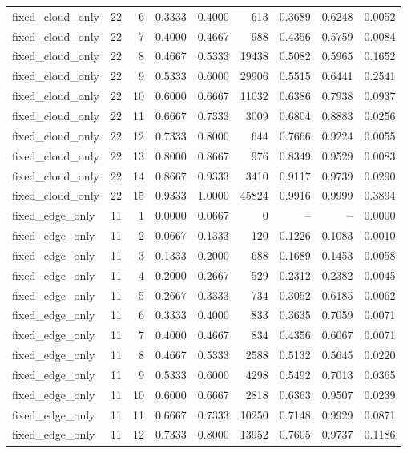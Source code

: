 \begin{tabular}{lrrrrrrrr}
fixed\_cloud\_only & 22 & 6 & 0.3333 & 0.4000 & 613 & 0.3689 & 0.6248 & 0.0052 \\
fixed\_cloud\_only & 22 & 7 & 0.4000 & 0.4667 & 988 & 0.4356 & 0.5759 & 0.0084 \\
fixed\_cloud\_only & 22 & 8 & 0.4667 & 0.5333 & 19438 & 0.5082 & 0.5965 & 0.1652 \\
fixed\_cloud\_only & 22 & 9 & 0.5333 & 0.6000 & 29906 & 0.5515 & 0.6441 & 0.2541 \\
fixed\_cloud\_only & 22 & 10 & 0.6000 & 0.6667 & 11032 & 0.6386 & 0.7938 & 0.0937 \\
fixed\_cloud\_only & 22 & 11 & 0.6667 & 0.7333 & 3009 & 0.6804 & 0.8883 & 0.0256 \\
fixed\_cloud\_only & 22 & 12 & 0.7333 & 0.8000 & 644 & 0.7666 & 0.9224 & 0.0055 \\
fixed\_cloud\_only & 22 & 13 & 0.8000 & 0.8667 & 976 & 0.8349 & 0.9529 & 0.0083 \\
fixed\_cloud\_only & 22 & 14 & 0.8667 & 0.9333 & 3410 & 0.9117 & 0.9739 & 0.0290 \\
fixed\_cloud\_only & 22 & 15 & 0.9333 & 1.0000 & 45824 & 0.9916 & 0.9999 & 0.3894 \\
fixed\_edge\_only & 11 & 1 & 0.0000 & 0.0667 & 0 & -- & -- & 0.0000 \\
fixed\_edge\_only & 11 & 2 & 0.0667 & 0.1333 & 120 & 0.1226 & 0.1083 & 0.0010 \\
fixed\_edge\_only & 11 & 3 & 0.1333 & 0.2000 & 688 & 0.1689 & 0.1453 & 0.0058 \\
fixed\_edge\_only & 11 & 4 & 0.2000 & 0.2667 & 529 & 0.2312 & 0.2382 & 0.0045 \\
fixed\_edge\_only & 11 & 5 & 0.2667 & 0.3333 & 734 & 0.3052 & 0.6185 & 0.0062 \\
fixed\_edge\_only & 11 & 6 & 0.3333 & 0.4000 & 833 & 0.3635 & 0.7059 & 0.0071 \\
fixed\_edge\_only & 11 & 7 & 0.4000 & 0.4667 & 834 & 0.4356 & 0.6067 & 0.0071 \\
fixed\_edge\_only & 11 & 8 & 0.4667 & 0.5333 & 2588 & 0.5132 & 0.5645 & 0.0220 \\
fixed\_edge\_only & 11 & 9 & 0.5333 & 0.6000 & 4298 & 0.5492 & 0.7013 & 0.0365 \\
fixed\_edge\_only & 11 & 10 & 0.6000 & 0.6667 & 2818 & 0.6363 & 0.9507 & 0.0239 \\
fixed\_edge\_only & 11 & 11 & 0.6667 & 0.7333 & 10250 & 0.7148 & 0.9929 & 0.0871 \\
fixed\_edge\_only & 11 & 12 & 0.7333 & 0.8000 & 13952 & 0.7605 & 0.9737 & 0.1186 \\

\end{tabular}
